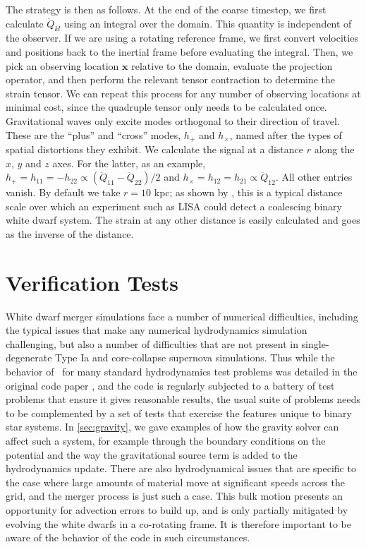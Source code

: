 \documentclass[12pt]{article}
\begin{document}
The strategy is then as follows. At the end of the coarse timestep, we first calculate $\ddot{Q}_{kl}$
using an integral over the domain. This quantity is independent of the observer. If we 
are using a rotating reference frame, we first convert velocities and positions back to the inertial 
frame before evaluating the integral. Then, 
we pick an observing location $\mathbf{x}$ relative to the domain, evaluate the projection operator, 
and then perform the relevant tensor contraction to determine the strain tensor. We can 
repeat this process for any number of observing locations at minimal cost, since the quadruple tensor 
only needs to be calculated once. Gravitational waves only excite modes orthogonal to their 
direction of travel. These are the ``plus'' and ``cross'' modes, $h_+$ and $h_\times$, named after 
the types of spatial distortions they exhibit. We calculate the signal at a distance $r$ along 
the $x$, $y$ and $z$ axes. For the latter, as an example, $h_{+} = h_{11} = -h_{22} \propto (\ddot{Q}_{11} - \ddot{Q}_{22})/2$ and 
$h_{\times} = h_{12} = h_{21} \propto \ddot{Q}_{12}$. All other entries vanish. By default we take $r = 10$ kpc; 
as shown by \citet{loren-aguilar:2005}, this is a typical distance scale over which an 
experiment such as LISA could detect a coalescing binary white dwarf system. 
The strain at any other distance is easily calculated and goes as the inverse of the distance.



\newpage
\section{Verification Tests}
\label{sec:verification}

White dwarf merger simulations face a number of numerical difficulties,
including the typical issues that make any numerical hydrodynamics simulation
challenging, but also a number of difficulties that are
not present in single-degenerate Type Ia and core-collapse supernova
simulations.  Thus while the behavior of \castro\ for many standard hydrodynamics
test problems was detailed in the original code paper \citep{castro}, and the code
is regularly subjected to a battery of test problems that ensure it gives reasonable
results, the usual suite of problems needs to be complemented by a set of tests
that exercise the features unique to binary star systems. In \autoref{sec:gravity},
we gave examples of how the gravity solver can affect such a system, for example
through the boundary conditions on the potential and the way the gravitational source
term is added to the hydrodynamics update. There are also hydrodynamical issues that
are specific to the case where large amounts of material move at significant speeds
across the grid, and the merger process is just such a case. This bulk motion presents
an opportunity for advection errors to build up, and is only partially mitigated by
evolving the white dwarfs in a co-rotating frame. It is therefore important to be
aware of the behavior of the code in such circumstances.
\end{document}
